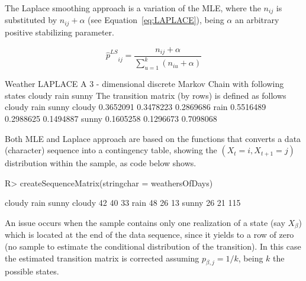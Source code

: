 \documentclass[nojss]{jss}
\begin{document}
The Laplace smoothing approach is a variation of the MLE, where the $n_{ij}$
is substituted by $n_{ij}+\alpha$ (see Equation~\ref{eq:LAPLACE}), being
$\alpha$ an arbitrary positive stabilizing parameter.

\begin{equation}
{\hat p^{LS}}_{ij} = \frac{{{n_{ij}} + \alpha }}{{\sum\limits_{u = 1}^k {\left( {{n_{iu}} + \alpha } \right)} }}
\label{eq:LAPLACE}
\end{equation}



\begin{Schunk}
\begin{Soutput}
Weather LAPLACE 
 A  3 - dimensional discrete Markov Chain with following states 
 cloudy rain sunny 
 The transition matrix   (by rows)  is defined as follows 
          cloudy      rain     sunny
cloudy 0.3652091 0.3478223 0.2869686
rain   0.5516489 0.2988625 0.1494887
sunny  0.1605258 0.1296673 0.7098068
\end{Soutput}
\end{Schunk}


Both MLE and Laplace approach are based on the 
functions that converts a data (character) sequence into a contingency table,
showing the $\left( X_{t}=i, X_{t+1}=j\right)$ distribution within the sample,
as code below shows. 

\begin{Schunk}
\begin{Sinput}
R> createSequenceMatrix(stringchar = weathersOfDays)
\end{Sinput}
\begin{Soutput}
       cloudy rain sunny
cloudy     42   40    33
rain       48   26    13
sunny      26   21   115
\end{Soutput}
\end{Schunk}


An issue occurs when the sample contains only one realization of a state (say $X_{\beta}$) which is located at the end of the data sequence, since it yields to a row of zero (no sample to estimate the conditional
distribution of the transition). In this case the estimated transition matrix is
corrected assuming $p_{\beta,j}=1/k$, being $k$ the possible states.
\end{document}
